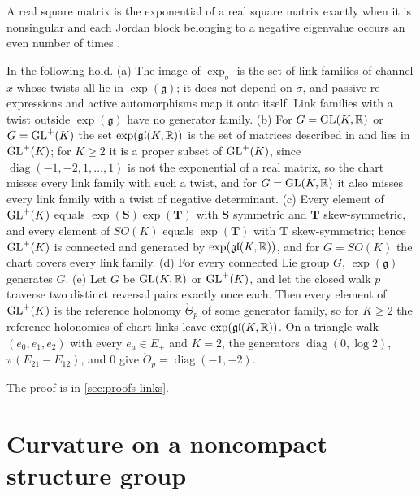 A real square matrix is the exponential of a real square matrix exactly when it is nonsingular and
each Jordan block belonging to a negative eigenvalue occurs an even number of times
\citep[Theorem~1]{culver1966existence}. 

In  the following hold. (a) The image of $\exp_\sigma$ is the set of
link families of channel $x$ whose twists all lie in $\exp(\mathfrak g)$; it does not depend on
$\sigma$, and passive re-expressions and active automorphisms map it onto itself. Link families with a
twist outside $\exp(\mathfrak g)$ have no generator family. (b) For $G=\mathrm{GL}(K,\mathbb R)$ or $G=\mathrm{GL}^+(K)$ the
set $\exp(\mathfrak{gl}(K,\mathbb R))$ is the set of matrices described in 
and lies in $\mathrm{GL}^+(K)$; for $K\geq2$ it is a proper subset of $\mathrm{GL}^+(K)$, since
$\operatorname{diag}(-1,-2,1,\ldots,1)$ is not the exponential of a real matrix, so the chart misses
every link family with such a twist, and for $G=\mathrm{GL}(K,\mathbb R)$ it also misses every link family with a
twist of negative determinant. (c) Every element of $\mathrm{GL}^+(K)$ equals $\exp(\mathbf S)\exp(\mathbf T)$
with $\mathbf S$ symmetric and $\mathbf T$ skew-symmetric, and every element of $SO(K)$ equals
$\exp(\mathbf T)$ with $\mathbf T$ skew-symmetric; hence $\mathrm{GL}^+(K)$ is connected and generated by
$\exp(\mathfrak{gl}(K,\mathbb R))$, and for $G=SO(K)$ the chart covers every link family. (d) For every
connected Lie group $G$, $\exp(\mathfrak g)$ generates $G$. (e) Let $G$ be $\mathrm{GL}(K,\mathbb R)$ or $\mathrm{GL}^+(K)$,
and let the closed walk $p$ traverse two distinct reversal pairs exactly once each. Then every element
of $\mathrm{GL}^+(K)$ is the reference holonomy $\mathring\Theta_p$ of some generator family, so for $K\geq2$
the reference holonomies of chart links leave $\exp(\mathfrak{gl}(K,\mathbb R))$. On a triangle walk
$(e_0,e_1,e_2)$ with every $e_a\in E_+$ and $K=2$, the generators $\operatorname{diag}(0,\log2)$,
$\pi(E_{21}-E_{12})$, and $0$ give $\mathring\Theta_p=\operatorname{diag}(-1,-2)$. 

The proof is in \cref{sec:proofs-links}.

\section{Curvature on a noncompact structure group}
\label{sec:link-curvature}

